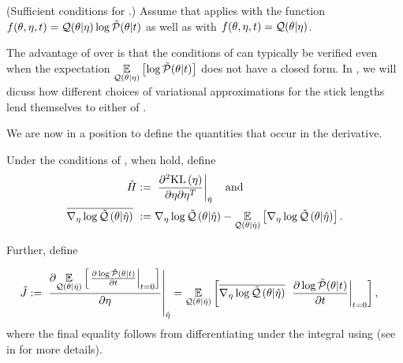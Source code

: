 %
\begin{assu}
(Sufficient conditions for .)
%
Assume that  applies with the function
$f(\theta, \eta, t) = \mathcal{Q}(\theta \vert \eta) \log \tilde{\mathcal{P}}(\theta \vert t)$
as well as with $f(\theta, \eta, t) = \mathcal{Q}(\theta \vert \eta)$.
%
\end{assu}

The advantage of  over  is
that the conditions of  can typically be verified
even when the expectation $\underset{\mathcal{Q}(\theta \vert \eta)}{\mathbb{E}}\left[\log \tilde{\mathcal{P}}(\theta
\vert t)\right]$ does not have a closed form.  In , we
will dicuss how different choices of variational approximations for the stick
lengths lend themselves to either  of
.

We are now in a position to define the quantities that occur in the derivative.

\begin{defn}
%
Under the conditions of , when  hold, define
%
\begin{align*}
%
\hessopt :={}& \fracat{\partial^2 \KL{\eta}}
                      {\partial \eta \partial \eta^T}
                      {\etaopt} \mathand \\
%
\lqgradbar{\theta \vert \etaopt} :={}&
    \lqgrad{\theta \vert \etaopt} -
    \expect{\q(\theta \vert \etaopt)}{\lqgrad{\theta \vert \etaopt}}.
%
\end{align*}


Further, define

\begin{align*}
%
\crosshessian :={}&
    \fracat{\partial
            \expect{\q(\theta \vert \etaopt)}
                   {\fracat{\partial \log \ptil(\theta \vert \t)}
                           {\partial \t}{\t=0} }
            }
        {\partial \eta}{\etaopt}
={}
    \expect{\q(\theta \vert \etaopt)}{
          \lqgradbar{\theta \vert \etaopt}
          \fracat{\partial \log \ptil(\theta \vert \t)}
                 {\partial \t}{\t=0}},
%
\end{align*}
%
where the final equality follows from differentiating under the integral using
 (see  in  for
more details).
%
\end{defn}


